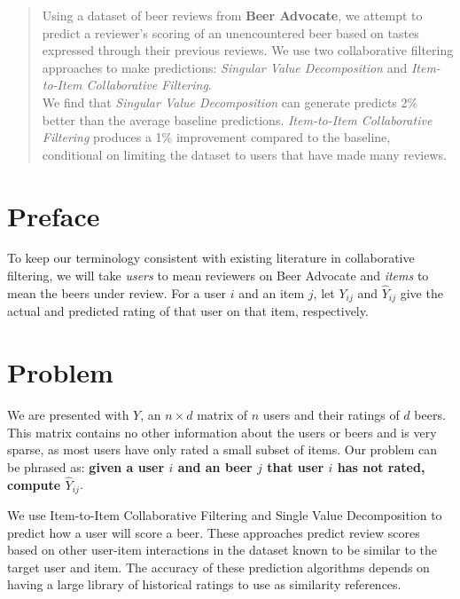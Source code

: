 \documentclass[12pt]{article}
\begin{document}
\maketitle
\begin{abstract}
Using a dataset of beer reviews from \textbf{Beer Advocate}, we attempt to predict a reviewer's scoring of an unencountered beer based on tastes expressed through their previous reviews. We use two collaborative filtering approaches to make predictions: \textit{Singular Value Decomposition} and \textit{Item-to-Item Collaborative Filtering}. \\

We find that \textit{Singular Value Decomposition} can generate predicts 2\% better than the average baseline predictions. \textit{Item-to-Item Collaborative Filtering} produces a 1\% improvement compared to the baseline, conditional on limiting the dataset to users that have made many reviews. \\
\end{abstract}



\section{Preface}
To keep our terminology consistent with existing literature in collaborative filtering, we will take \textit{users} to mean reviewers on Beer Advocate and \textit{items} to mean the beers under review. For a user $i$ and an item $j$, let $Y_{ij}$ and $\hat Y_{ij}$ give the actual and predicted rating of that user on that item, respectively.

\section{Problem}
We are presented with $Y$, an $n \times d$ matrix of $n$ users and their ratings of $d$ beers. This matrix contains no other information about the users or beers and is very sparse, as most users have only rated a small subset of items. Our problem can be phrased as: \textbf{given a user $i$ and an beer $j$ that user $i$ has not rated, compute $\hat Y_{ij}$}.

We use Item-to-Item Collaborative Filtering and Single Value Decomposition to predict how a user will score a beer. These approaches predict review scores based on other user-item interactions in the dataset known to be similar to the target user and item. The accuracy of these prediction algorithms depends on having a large library of historical ratings to use as similarity references.\textsuperscript{\cite{sarwar}}
\end{document}
